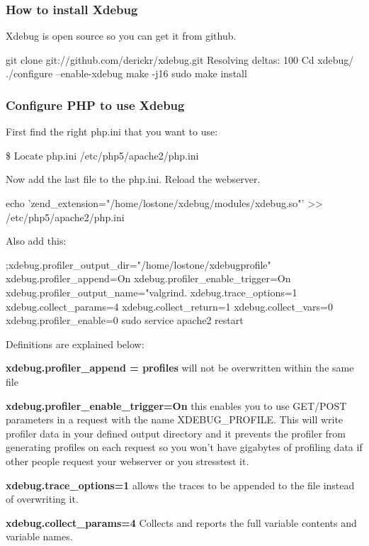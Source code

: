 \subsubsection{How to install Xdebug}
Xdebug is open source so you can get it from github.
\begin{codelisting}
git clone git://github.com/derickr/xdebug.git
Resolving deltas: 100%
Cd xdebug/
./configure --enable-xdebug
make -j16
sudo make install
\end{codelisting}

\subsubsection{Configure PHP to use Xdebug}
First find the right php.ini that you want to use:
\begin{codelisting}
\$ Locate php.ini
/etc/php5/apache2/php.ini	
\end{codelisting}

Now add the last file to the php.ini. Reload the webserver.
\begin{codelisting}
echo 'zend_extension="/home/lostone/xdebug/modules/xdebug.so"' >> /etc/php5/apache2/php.ini
\end{codelisting}
Also add this:
\begin{codelisting}
;xdebug.profiler_output_dir="/home/lostone/xdebugprofile"
xdebug.profiler_append=On
xdebug.profiler_enable_trigger=On
xdebug.profiler_output_name="valgrind.%
xdebug.trace_options=1
xdebug.collect_params=4
xdebug.collect_return=1
xdebug.collect_vars=0
xdebug.profiler_enable=0
sudo service apache2 restart
\end{codelisting}

Definitions are explained below\cite{xdebug_website}:

\textbf{xdebug.profiler\_append = profiles} will not be overwritten within the same file

\textbf{xdebug.profiler\_enable\_trigger=On} this enables you to use GET/POST parameters in a request with the name XDEBUG\_PROFILE. This will write profiler data in your defined output directory and it prevents the profiler from generating profiles on each request so you won't have gigabytes of profiling data if other people request your webserver or you stresstest it.

\textbf{xdebug.trace\_options=1 }allows the traces to be appended to the file instead of overwriting it.

\textbf{xdebug.collect\_params=4} Collects and reports the full variable contents and variable names.


